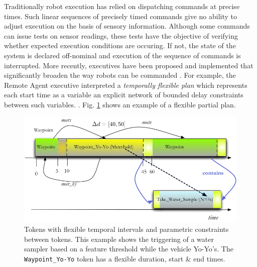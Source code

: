 Traditionally robot execution has relied on dispatching commands at
precise times. Such linear sequences of precisely timed commands give
no ability to adjust execution on the basis of sensory
information. Although some commands can issue tests on sensor
readings, these tests have the objective of verifying whether expected
execution conditions are occuring. If not, the state of the system is
declared off-nominal and execution of the sequence of commands is
interrupted. More recently, executives have been proposed and
implemented that significantly broaden the way robots can be commanded
\cite{mus98,alami:1998p820}. For example, the Remote Agent executive
interpreted a \textit{temporally flexible plan} which represents each
start time as a  variable
 an explicit network of bounded delay constraints
between such variables. . Fig. \ref{fig:flex-timelines}
shows an example of a flexible partial plan.

\begin{figure}[!tb]
\centering
\includegraphics[scale=2.3]{figs/flexible-timelines.jpeg}
\caption{\small Tokens with flexible temporal intervals and parametric
  constraints between tokens. This example shows the triggering of a
  water sampler based on a feature threshold while the vehicle
  Yo-Yo's. The \texttt{Waypoint\_Yo-Yo} token has a flexible duration,
  start \& end times.}
\label{fig:flex-timelines}
\end{figure}

